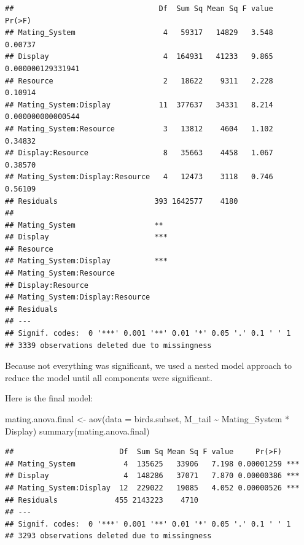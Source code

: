 \documentclass[
  12pt,
]{article}
\newenvironment{Shaded}{\begin{snugshade}}{\end{snugshade}}
\newcommand{\AttributeTok}[1]{\textcolor[rgb]{0.77,0.63,0.00}{#1}}
\newcommand{\FunctionTok}[1]{\textcolor[rgb]{0.00,0.00,0.00}{#1}}
\newcommand{\NormalTok}[1]{#1}
\newcommand{\OtherTok}[1]{\textcolor[rgb]{0.56,0.35,0.01}{#1}}
\newcommand{\SpecialCharTok}[1]{\textcolor[rgb]{0.00,0.00,0.00}{#1}}
\begin{document}
\begin{verbatim}
##                                 Df  Sum Sq Mean Sq F value            Pr(>F)
## Mating_System                    4   59317   14829   3.548           0.00737
## Display                          4  164931   41233   9.865 0.000000129331941
## Resource                         2   18622    9311   2.228           0.10914
## Mating_System:Display           11  377637   34331   8.214 0.000000000000544
## Mating_System:Resource           3   13812    4604   1.102           0.34832
## Display:Resource                 8   35663    4458   1.067           0.38570
## Mating_System:Display:Resource   4   12473    3118   0.746           0.56109
## Residuals                      393 1642577    4180                          
##                                   
## Mating_System                  ** 
## Display                        ***
## Resource                          
## Mating_System:Display          ***
## Mating_System:Resource            
## Display:Resource                  
## Mating_System:Display:Resource    
## Residuals                         
## ---
## Signif. codes:  0 '***' 0.001 '**' 0.01 '*' 0.05 '.' 0.1 ' ' 1
## 3339 observations deleted due to missingness
\end{verbatim}

Because not everything was significant, we used a nested model approach
to reduce the model until all components were significant.

\newpage

Here is the final model:

\begin{Shaded}
\begin{Highlighting}[]
\NormalTok{mating.anova.final }\OtherTok{\textless{}{-}} \FunctionTok{aov}\NormalTok{(}\AttributeTok{data =}\NormalTok{ birds.subset, M\_tail }\SpecialCharTok{\textasciitilde{}}\NormalTok{ Mating\_System }\SpecialCharTok{*}\NormalTok{ Display)}
\FunctionTok{summary}\NormalTok{(mating.anova.final)}
\end{Highlighting}
\end{Shaded}

\begin{verbatim}
##                        Df  Sum Sq Mean Sq F value     Pr(>F)    
## Mating_System           4  135625   33906   7.198 0.00001259 ***
## Display                 4  148286   37071   7.870 0.00000386 ***
## Mating_System:Display  12  229022   19085   4.052 0.00000526 ***
## Residuals             455 2143223    4710                       
## ---
## Signif. codes:  0 '***' 0.001 '**' 0.01 '*' 0.05 '.' 0.1 ' ' 1
## 3293 observations deleted due to missingness
\end{verbatim}
\end{document}
